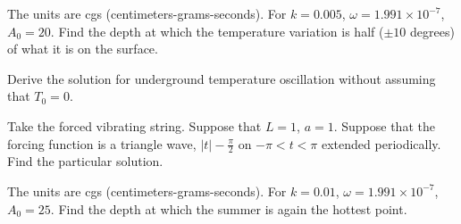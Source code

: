 \begin{exercise}
The units are cgs (centimeters-grams-seconds).
For $k=0.005$, $\omega = 1.991 \times {10}^{-7}$, $A_0 = 20$.
Find the depth at which the temperature variation is half ($\pm 10$
degrees) of what it is on the surface.
\end{exercise}

\begin{exercise}
Derive the solution for underground temperature oscillation without assuming
that $T_0 = 0$.
\end{exercise}

\setcounter{exercise}{100}

\begin{exercise}
Take the forced vibrating string.
Suppose that $L=1$, $a=1$.  Suppose that the forcing function
is a triangle wave, $\lvert t \rvert -\frac{\pi}{2}$
on $-\pi < t < \pi$ extended periodically.
Find the particular solution.
\end{exercise}

\begin{exercise}
The units are cgs (centimeters-grams-seconds).
For $k=0.01$, $\omega = 1.991 \times {10}^{-7}$, $A_0 = 25$.
Find the depth at which the summer is again the hottest point.
\end{exercise}
